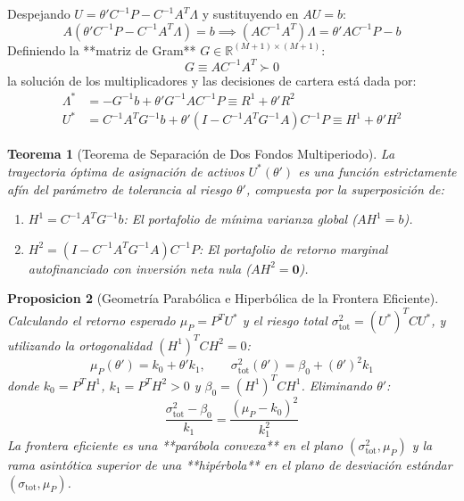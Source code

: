\documentclass[11pt,a4paper]{report}
\newtheorem{theorem}{Teorema}[chapter]
\newtheorem{proposition}[theorem]{Proposicion}
\numberwithin{equation}{chapter}
\begin{document}
Despejando $U = \theta' C^{-1} P - C^{-1} A^T \Lambda$ y sustituyendo en $AU = b$:
\begin{equation}
    A(\theta' C^{-1} P - C^{-1} A^T \Lambda) = b \implies (A C^{-1} A^T) \Lambda = \theta' A C^{-1} P - b
\end{equation}
Definiendo la **matriz de Gram** $G \in \mathbb{R}^{(M+1)\times(M+1)}$:
\begin{equation}
    \boxed{G \equiv A C^{-1} A^T \succ 0}
\end{equation}
la solución de los multiplicadores y las decisiones de cartera está dada por:
\begin{align}
    \Lambda^* &= -G^{-1} b + \theta' G^{-1} A C^{-1} P \equiv R^1 + \theta' R^2 \\
    U^* &= C^{-1} A^T G^{-1} b + \theta' (I - C^{-1} A^T G^{-1} A) C^{-1} P \equiv \boxed{H^1 + \theta' H^2}
\end{align}

\begin{theorem}[Teorema de Separación de Dos Fondos Multiperiodo]
La trayectoria óptima de asignación de activos $U^*(\theta')$ es una función estrictamente afín del parámetro de tolerancia al riesgo $\theta'$, compuesta por la superposición de:
\begin{enumerate}
    \item $H^1 = C^{-1} A^T G^{-1} b$: El portafolio de mínima varianza global ($A H^1 = b$).
    \item $H^2 = (I - C^{-1} A^T G^{-1} A) C^{-1} P$: El portafolio de retorno marginal autofinanciado con inversión neta nula ($A H^2 = \mathbf{0}$).
\end{enumerate}
\end{theorem}

\begin{proposition}[Geometría Parabólica e Hiperbólica de la Frontera Eficiente]
Calculando el retorno esperado $\mu_P = P^T U^*$ y el riesgo total $\sigma_{\mathrm{tot}}^2 = (U^*)^T C U^*$, y utilizando la ortogonalidad $(H^1)^T C H^2 = 0$:
\begin{equation}
    \mu_P(\theta') = k_0 + \theta' k_1, \qquad \sigma_{\mathrm{tot}}^2(\theta') = \beta_0 + (\theta')^2 k_1
\end{equation}
donde $k_0 = P^T H^1$, $k_1 = P^T H^2 > 0$ y $\beta_0 = (H^1)^T C H^1$. Eliminando $\theta'$:
\begin{equation}
    \boxed{\frac{\sigma_{\mathrm{tot}}^2 - \beta_0}{k_1} = \frac{(\mu_P - k_0)^2}{k_1^2}}
\end{equation}
La frontera eficiente es una **parábola convexa** en el plano $(\sigma_{\mathrm{tot}}^2, \mu_P)$ y la rama asintótica superior de una **hipérbola** en el plano de desviación estándar $(\sigma_{\mathrm{tot}}, \mu_P)$.
\end{proposition}
\end{document}
